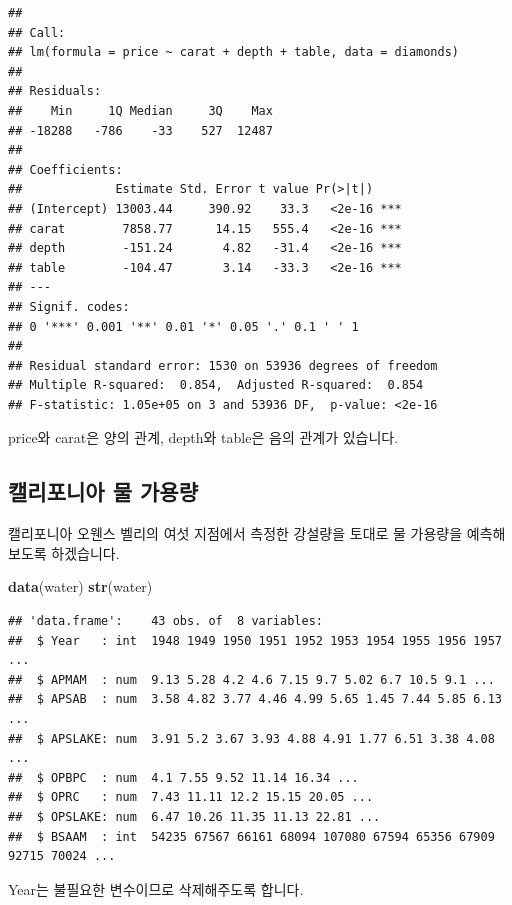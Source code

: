 \documentclass[12pt,]{book}
\newenvironment{Shaded}{\begin{snugshade}}{\end{snugshade}}
\newcommand{\KeywordTok}[1]{\textcolor[rgb]{0.13,0.29,0.53}{\textbf{#1}}}
\newcommand{\NormalTok}[1]{#1}
\begin{document}
\begin{verbatim}
## 
## Call:
## lm(formula = price ~ carat + depth + table, data = diamonds)
## 
## Residuals:
##    Min     1Q Median     3Q    Max 
## -18288   -786    -33    527  12487 
## 
## Coefficients:
##             Estimate Std. Error t value Pr(>|t|)    
## (Intercept) 13003.44     390.92    33.3   <2e-16 ***
## carat        7858.77      14.15   555.4   <2e-16 ***
## depth        -151.24       4.82   -31.4   <2e-16 ***
## table        -104.47       3.14   -33.3   <2e-16 ***
## ---
## Signif. codes:  
## 0 '***' 0.001 '**' 0.01 '*' 0.05 '.' 0.1 ' ' 1
## 
## Residual standard error: 1530 on 53936 degrees of freedom
## Multiple R-squared:  0.854,  Adjusted R-squared:  0.854 
## F-statistic: 1.05e+05 on 3 and 53936 DF,  p-value: <2e-16
\end{verbatim}

price와 carat은 양의 관계, depth와 table은 음의 관계가 있습니다.

\hypertarget{uxce98uxb9acuxd3ecuxb2c8uxc544-uxbb3c-uxac00uxc6a9uxb7c9}{%
\subsection{캘리포니아 물 가용량}\label{uxce98uxb9acuxd3ecuxb2c8uxc544-uxbb3c-uxac00uxc6a9uxb7c9}}

캘리포니아 오웬스 벨리의 여섯 지점에서 측정한 강설량을 토대로 물 가용량을 예측해보도록 하겠습니다.

\begin{Shaded}
\begin{Highlighting}[]
\KeywordTok{data}\NormalTok{(water)}
\KeywordTok{str}\NormalTok{(water)}
\end{Highlighting}
\end{Shaded}

\begin{verbatim}
## 'data.frame':    43 obs. of  8 variables:
##  $ Year   : int  1948 1949 1950 1951 1952 1953 1954 1955 1956 1957 ...
##  $ APMAM  : num  9.13 5.28 4.2 4.6 7.15 9.7 5.02 6.7 10.5 9.1 ...
##  $ APSAB  : num  3.58 4.82 3.77 4.46 4.99 5.65 1.45 7.44 5.85 6.13 ...
##  $ APSLAKE: num  3.91 5.2 3.67 3.93 4.88 4.91 1.77 6.51 3.38 4.08 ...
##  $ OPBPC  : num  4.1 7.55 9.52 11.14 16.34 ...
##  $ OPRC   : num  7.43 11.11 12.2 15.15 20.05 ...
##  $ OPSLAKE: num  6.47 10.26 11.35 11.13 22.81 ...
##  $ BSAAM  : int  54235 67567 66161 68094 107080 67594 65356 67909 92715 70024 ...
\end{verbatim}

Year는 불필요한 변수이므로 삭제해주도록 합니다.
\end{document}
